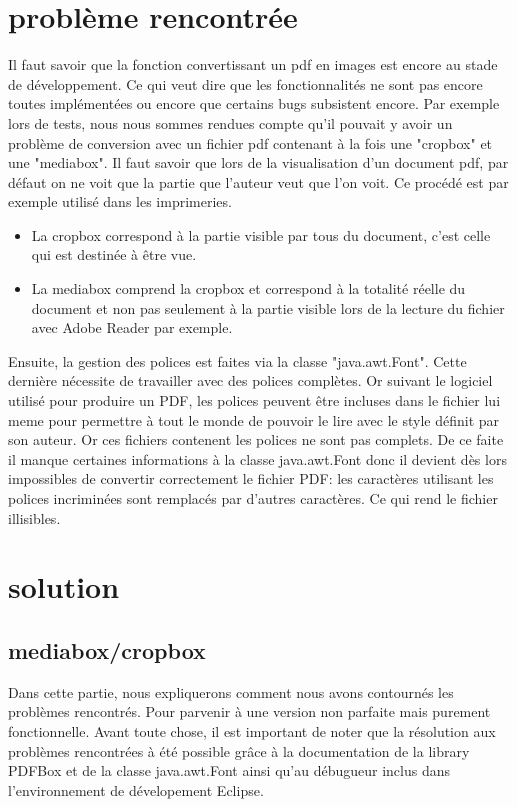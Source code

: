 	\section{problème rencontrée}
		Il faut savoir que la fonction convertissant un pdf en images est encore au stade de développement. Ce qui veut dire que  les fonctionnalités ne sont pas encore toutes implémentées ou encore que certains bugs subsistent encore. Par exemple lors de tests, nous nous sommes rendues
		compte qu'il pouvait y avoir un problème de conversion avec un fichier pdf contenant à la fois une "cropbox" et une "mediabox". Il faut savoir que lors de la visualisation d'un document pdf, par défaut on ne voit que la partie que l'auteur veut que l'on voit. Ce procédé est par exemple
		utilisé dans les imprimeries. 
		\newline
		\begin{itemize}
			\item   La cropbox correspond  à la partie visible par tous du document, c'est celle qui est destinée à être vue.
			\item   La mediabox comprend la cropbox et correspond à la totalité réelle du document et non pas seulement à la partie visible lors de la lecture du fichier avec Adobe Reader par exemple. 
		\end{itemize}
		Ensuite, la gestion des polices est faites via la classe "java.awt.Font". Cette dernière nécessite de travailler avec des polices complètes. Or	suivant le logiciel utilisé pour produire un PDF, les polices peuvent être incluses dans le fichier lui meme pour permettre à tout le monde de pouvoir le lire avec 
		le style définit par son auteur. Or ces fichiers contenent les polices ne sont  pas complets. De ce faite il manque certaines informations à la classe java.awt.Font donc il devient dès lors impossibles de convertir correctement le fichier PDF: les caractères utilisant les polices incriminées sont remplacés par d'autres 				caractères. Ce qui rend le fichier illisibles.

	\section{solution}
		\subsection{mediabox/cropbox}
	Dans cette partie, nous expliquerons comment nous avons contournés les problèmes rencontrés. Pour parvenir  à une version non parfaite mais purement fonctionnelle.
	\newline
	Avant toute chose, il est important de noter que la résolution aux problèmes rencontrées à été possible grâce à la documentation de la library PDFBox et de la classe java.awt.Font ainsi qu'au débugueur inclus dans l'environnement de dévelopement Eclipse.	
